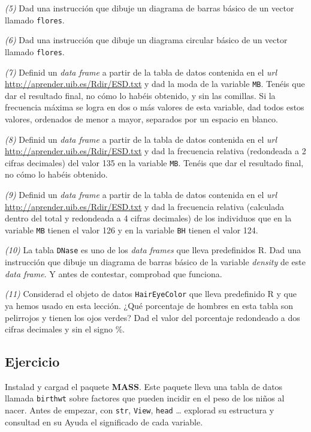 \documentclass[]{book}
\theoremstyle{definition}
\theoremstyle{definition}
\theoremstyle{definition}
\theoremstyle{remark}
\begin{document}
\emph{(5)} Dad una instrucción que dibuje un diagrama de barras básico de un vector llamado \texttt{flores}.

\emph{(6)} Dad una instrucción que dibuje un diagrama circular básico de un vector llamado \texttt{flores}.

\emph{(7)} Definid un \emph{data frame} a partir de la tabla de datos contenida en el \emph{url} \url{http://aprender.uib.es/Rdir/ESD.txt} y dad la moda de la variable \texttt{MB}. Tenéis que dar el resultado final, no cómo lo habéis obtenido, y sin las comillas. Si la frecuencia máxima se logra en dos o más valores de esta variable, dad todos estos valores, ordenados de menor a mayor, separados por un espacio en blanco.

\emph{(8)} Definid un \emph{data frame} a partir de la tabla de datos contenida en el \emph{url} \url{http://aprender.uib.es/Rdir/ESD.txt} y dad la frecuencia relativa (redondeada a 2 cifras decimales) del valor 135 en la variable \texttt{MB}. Tenéis que dar el resultado final, no cómo lo habéis obtenido.

\emph{(9)} Definid un \emph{data frame} a partir de la tabla de datos contenida en el \emph{url} \url{http://aprender.uib.es/Rdir/ESD.txt} y dad la frecuencia relativa (calculada dentro del total y redondeada a 4 cifras decimales) de los individuos que en la variable \texttt{MB} tienen el valor 126 y en la variable \texttt{BH} tienen el valor 124.

\emph{(10)} La tabla \texttt{DNase} es uno de los \emph{data frames} que lleva predefinidos R. Dad una instrucción que dibuje un diagrama de barras básico de la variable \emph{density} de este \emph{data frame}. Y antes de contestar, comprobad que funciona.

\emph{(11)} Considerad el objeto de datos \texttt{HairEyeColor} que lleva predefinido R y que ya hemos usado en esta lección. ¿Qué porcentaje de hombres en esta tabla son pelirrojos y tienen los ojos verdes? Dad el valor del porcentaje redondeado a dos cifras decimales y sin el signo \%.

\hypertarget{ejercicio-7}{%
\subsection*{Ejercicio}\label{ejercicio-7}}

Instalad y cargad el paquete \textbf{MASS}. Este paquete lleva una tabla de datos llamada \texttt{birthwt} sobre factores que pueden incidir en el peso de los niños al nacer. Antes de empezar, con \texttt{str}, \texttt{View}, \texttt{head} \ldots{} explorad su estructura y consultad en su Ayuda el significado de cada variable.
\end{document}
